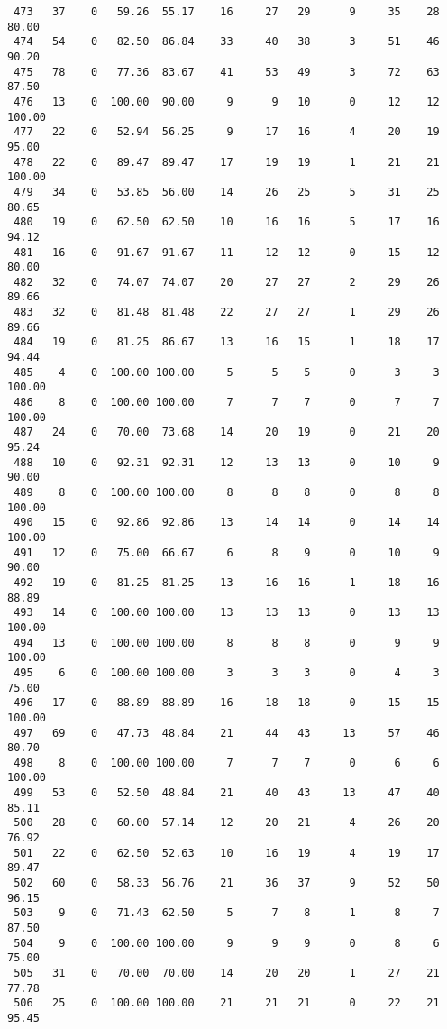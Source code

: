 \begin{verbatim}
 473   37    0   59.26  55.17    16     27   29      9     35    28    80.00
 474   54    0   82.50  86.84    33     40   38      3     51    46    90.20
 475   78    0   77.36  83.67    41     53   49      3     72    63    87.50
 476   13    0  100.00  90.00     9      9   10      0     12    12   100.00
 477   22    0   52.94  56.25     9     17   16      4     20    19    95.00
 478   22    0   89.47  89.47    17     19   19      1     21    21   100.00
 479   34    0   53.85  56.00    14     26   25      5     31    25    80.65
 480   19    0   62.50  62.50    10     16   16      5     17    16    94.12
 481   16    0   91.67  91.67    11     12   12      0     15    12    80.00
 482   32    0   74.07  74.07    20     27   27      2     29    26    89.66
 483   32    0   81.48  81.48    22     27   27      1     29    26    89.66
 484   19    0   81.25  86.67    13     16   15      1     18    17    94.44
 485    4    0  100.00 100.00     5      5    5      0      3     3   100.00
 486    8    0  100.00 100.00     7      7    7      0      7     7   100.00
 487   24    0   70.00  73.68    14     20   19      0     21    20    95.24
 488   10    0   92.31  92.31    12     13   13      0     10     9    90.00
 489    8    0  100.00 100.00     8      8    8      0      8     8   100.00
 490   15    0   92.86  92.86    13     14   14      0     14    14   100.00
 491   12    0   75.00  66.67     6      8    9      0     10     9    90.00
 492   19    0   81.25  81.25    13     16   16      1     18    16    88.89
 493   14    0  100.00 100.00    13     13   13      0     13    13   100.00
 494   13    0  100.00 100.00     8      8    8      0      9     9   100.00
 495    6    0  100.00 100.00     3      3    3      0      4     3    75.00
 496   17    0   88.89  88.89    16     18   18      0     15    15   100.00
 497   69    0   47.73  48.84    21     44   43     13     57    46    80.70
 498    8    0  100.00 100.00     7      7    7      0      6     6   100.00
 499   53    0   52.50  48.84    21     40   43     13     47    40    85.11
 500   28    0   60.00  57.14    12     20   21      4     26    20    76.92
 501   22    0   62.50  52.63    10     16   19      4     19    17    89.47
 502   60    0   58.33  56.76    21     36   37      9     52    50    96.15
 503    9    0   71.43  62.50     5      7    8      1      8     7    87.50
 504    9    0  100.00 100.00     9      9    9      0      8     6    75.00
 505   31    0   70.00  70.00    14     20   20      1     27    21    77.78
 506   25    0  100.00 100.00    21     21   21      0     22    21    95.45

\end{verbatim}
